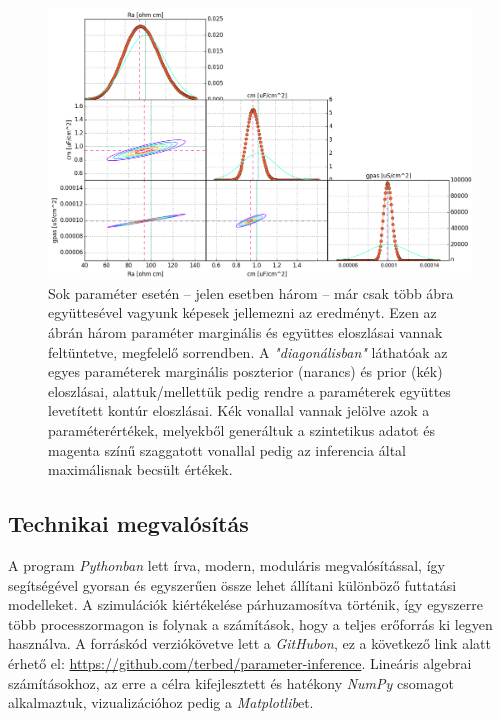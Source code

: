 \begin{figure}[h!]
	\centering
	\includegraphics[width=\textwidth]{./fig/figtypes/fullplot_P(10).png}
	\caption[Együttes és marginális eloszlásokat összefoglaló ábratípus]{Sok paraméter esetén -- jelen esetben három -- már csak több ábra együttesével vagyunk képesek jellemezni az eredményt. Ezen az ábrán három paraméter marginális és együttes eloszlásai vannak feltüntetve, megfelelő sorrendben. A \textit{"diagonálisban"} láthatóak az egyes paraméterek marginális poszterior (narancs) és prior (kék) eloszlásai, alattuk/mellettük pedig rendre a paraméterek együttes levetített kontúr eloszlásai. Kék vonallal vannak jelölve azok a paraméterértékek, melyekből generáltuk a szintetikus adatot és magenta színű szaggatott vonallal pedig az inferencia által maximálisnak becsült értékek.}%
	\label{fig:fullplot}
\end{figure}

\subsection{Technikai megvalósítás}
A program \textit{Pythonban} lett írva, modern, moduláris megvalósítással, így segítségével gyorsan és egyszerűen össze lehet állítani különböző futtatási modelleket. A szimulációk kiértékelése párhuzamosítva történik, így egyszerre több processzormagon is folynak a számítások, hogy a teljes erőforrás ki legyen használva. A forráskód verziókövetve lett a \textit{GitHubon}, ez a következő link alatt érhető el: \url{https://github.com/terbed/parameter-inference}. Lineáris algebrai számításokhoz, az erre a célra kifejlesztett és hatékony \textit{NumPy} csomagot alkalmaztuk, vizualizációhoz pedig a \textit{Matplotlib}et.

